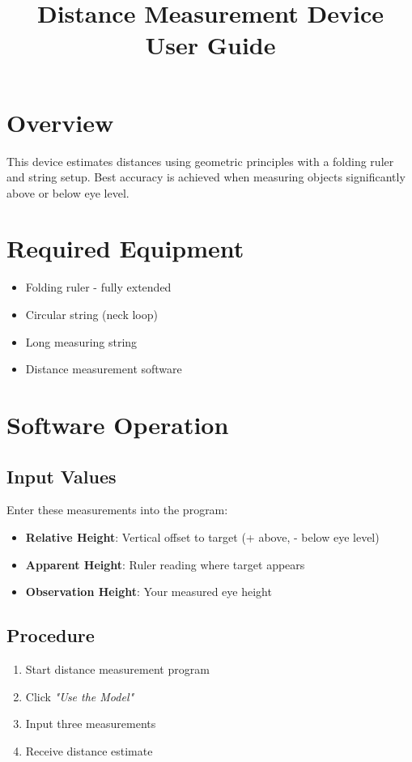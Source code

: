\documentclass[11pt,a4paper]{article}
\begin{document}
\title{\textbf{Distance Measurement Device}\\ \large User Guide}
\author{}
\date{}
\maketitle

\section{Overview}
This device estimates distances using geometric principles with a folding ruler and string setup. Best accuracy is achieved when measuring objects significantly above or below eye level.

\section{Required Equipment}
\begin{itemize}[noitemsep]
    \item Folding ruler - fully extended
    \item Circular string (neck loop)
    \item Long measuring string
    \item Distance measurement software
\end{itemize}

\section{Software Operation}

\subsection{Input Values}
Enter these measurements into the program:
\begin{itemize}[noitemsep]
    \item \textbf{Relative Height}: Vertical offset to target (+ above, - below eye level)
    \item \textbf{Apparent Height}: Ruler reading where target appears
    \item \textbf{Observation Height}: Your measured eye height
\end{itemize}

\subsection{Procedure}
\begin{enumerate}[noitemsep]
    \item Start distance measurement program
    \item Click \textit{"Use the Model"}
    \item Input three measurements
    \item Receive distance estimate
\end{enumerate}
\end{document}
